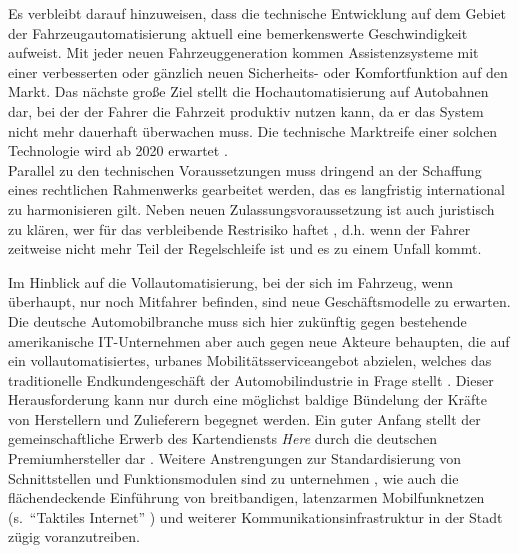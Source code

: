Es verbleibt darauf hinzuweisen, dass die technische Entwicklung auf dem Gebiet der Fahrzeugautomatisierung aktuell eine bemerkenswerte Geschwindigkeit aufweist. Mit jeder neuen Fahrzeuggeneration kommen Assistenzsysteme mit einer verbesserten oder gänzlich neuen Sicherheits- oder Komfortfunktion auf den Markt. Das nächste große Ziel stellt die Hochautomatisierung auf Autobahnen dar, bei der der Fahrer die Fahrzeit produktiv nutzen kann, da er das System nicht mehr dauerhaft überwachen muss. Die technische Marktreife einer solchen Technologie wird ab 2020 erwartet \cite{fraunhoferstudie2015}. \\
Parallel zu den technischen Voraussetzungen muss dringend an der Schaffung eines rechtlichen Rahmenwerks gearbeitet werden, das es langfristig international zu harmonisieren gilt. Neben neuen Zulassungsvoraussetzung ist auch juristisch zu klären, wer für das verbleibende Restrisiko haftet  \cite{lienkamp20rechtliche}, d.h. wenn der Fahrer zeitweise nicht mehr Teil der Regelschleife ist und es zu einem Unfall kommt.

Im Hinblick auf die Vollautomatisierung, bei der sich im Fahrzeug, wenn überhaupt, nur noch Mitfahrer befinden, sind neue Geschäftsmodelle zu erwarten. Die deutsche Automobilbranche muss sich hier zukünftig gegen bestehende amerikanische IT-Unternehmen aber auch gegen neue Akteure behaupten, die auf ein vollautomatisiertes, urbanes Mobilitätsserviceangebot abzielen, welches das traditionelle Endkundengeschäft der Automobilindustrie in Frage stellt \cite{fraunhoferstudie2015}. Dieser Herausforderung kann nur durch eine möglichst baldige Bündelung der Kräfte von Herstellern und Zulieferern begegnet werden. Ein guter Anfang stellt der gemeinschaftliche Erwerb des Kartendiensts \emph{Here} durch die deutschen Premiumhersteller dar \cite{burkert2015grosse}. Weitere Anstrengungen zur Standardisierung von Schnittstellen und Funktionsmodulen sind zu unternehmen \cite{furst2009autosar}, wie auch die flächendeckende Einführung von breitbandigen, latenzarmen Mobilfunknetzen (s.\ "`Taktiles Internet"' \cite{taktilesinternet2014}) und weiterer Kommunikationsinfrastruktur in der Stadt zügig voranzutreiben. 


\cleardoublepage






